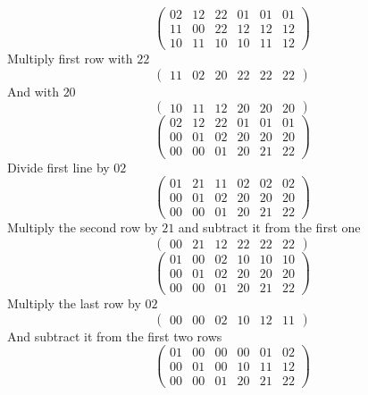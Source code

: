 \documentclass[10pt,a4paper]{article}
\begin{document}
\begin{equation*}
  \begin{pmatrix}
    02 & 12 & 22 & 01 & 01 & 01\\
    11 & 00 & 22 & 12 & 12 & 12\\
    10 & 11 & 10 & 10 & 11 & 12
  \end{pmatrix}
\end{equation*}
Multiply first row with $22$
\begin{equation*}
  \begin{pmatrix}
    11 & 02 & 20 & 22 & 22 & 22
  \end{pmatrix}
\end{equation*}
And with $20$
\begin{equation*}
  \begin{pmatrix}
    10 & 11 & 12 & 20 & 20 & 20
  \end{pmatrix}
\end{equation*}
\begin{equation*}
  \begin{pmatrix}
    02 & 12 & 22 & 01 & 01 & 01\\
    00 & 01 & 02 & 20 & 20 & 20\\
    00 & 00 & 01 & 20 & 21 & 22
  \end{pmatrix}
\end{equation*}
Divide first line by $02$
\begin{equation*}
  \begin{pmatrix}
    01 & 21 & 11 & 02 & 02 & 02\\
    00 & 01 & 02 & 20 & 20 & 20\\
    00 & 00 & 01 & 20 & 21 & 22
  \end{pmatrix}
\end{equation*}
Multiply the second row by $21$ and subtract it from the first one
\begin{equation*}
  \begin{pmatrix}
    00 & 21 & 12 & 22 & 22 & 22
  \end{pmatrix}
\end{equation*}
\begin{equation*}
  \begin{pmatrix}
    01 & 00 & 02 & 10 & 10 & 10\\
    00 & 01 & 02 & 20 & 20 & 20\\
    00 & 00 & 01 & 20 & 21 & 22
  \end{pmatrix}
\end{equation*}
Multiply the last row by $02$
\begin{equation*}
  \begin{pmatrix}
    00 & 00 & 02 & 10 & 12 & 11
  \end{pmatrix}
\end{equation*}
And subtract it from the first two rows
\begin{equation*}
  \begin{pmatrix}
    01 & 00 & 00 & 00 & 01 & 02\\
    00 & 01 & 00 & 10 & 11 & 12\\
    00 & 00 & 01 & 20 & 21 & 22
  \end{pmatrix}
\end{equation*}
\end{document}
